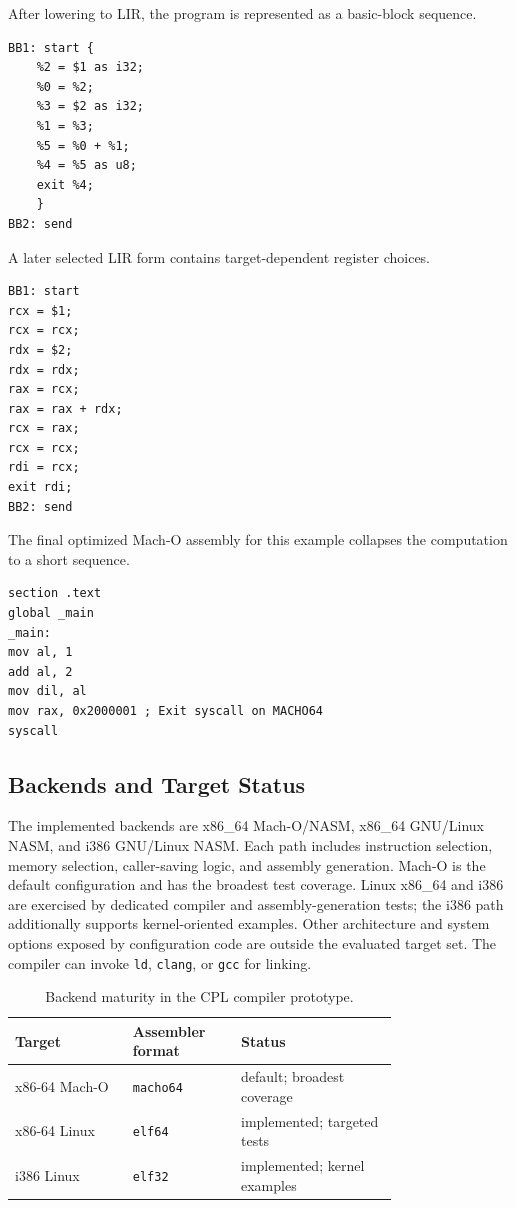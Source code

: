 \documentclass[10pt,twocolumn]{article}
\begin{document}
\par After lowering to LIR, the program is represented as a basic-block sequence.

\begin{lstlisting}[caption={LIR form before target-sensitive selection.}]
BB1: start {
    %2 = $1 as i32;
    %0 = %2;
    %3 = $2 as i32;
    %1 = %3;
    %5 = %0 + %1;
    %4 = %5 as u8;
    exit %4;
    }
BB2: send
\end{lstlisting}

\par A later selected LIR form contains target-dependent register choices.

\begin{lstlisting}[caption={Selected LIR form.}]
BB1: start
rcx = $1;
rcx = rcx;
rdx = $2;
rdx = rdx;
rax = rcx;
rax = rax + rdx;
rcx = rax;
rcx = rcx;
rdi = rcx;
exit rdi;
BB2: send
\end{lstlisting}

\par The final optimized Mach-O assembly for this example collapses the computation to a short sequence.

\begin{lstlisting}[caption={Generated assembly.}]
section .text
global _main
_main:
mov al, 1
add al, 2
mov dil, al
mov rax, 0x2000001 ; Exit syscall on MACHO64
syscall
\end{lstlisting}

\subsection{Backends and Target Status}

\par The implemented backends are x86\_64 Mach-O/NASM, x86\_64 GNU/Linux NASM, and i386 GNU/Linux NASM. Each path includes instruction selection, memory selection, caller-saving logic, and assembly generation. Mach-O is the default configuration and has the broadest test coverage. Linux x86\_64 and i386 are exercised by dedicated compiler and assembly-generation tests; the i386 path additionally supports kernel-oriented examples. Other architecture and system options exposed by configuration code are outside the evaluated target set. The compiler can invoke \texttt{ld}, \texttt{clang}, or \texttt{gcc} for linking.

\begin{table}[t]
\centering
\footnotesize
\caption{Backend maturity in the CPL compiler prototype.}
\label{tab:backend-maturity}
\begin{tabular}{p{0.24\linewidth}p{0.20\linewidth}p{0.32\linewidth}}
\toprule
Target        & Assembler format & Status                       \\
\midrule
x86-64 Mach-O & \texttt{macho64} & default; broadest coverage   \\
x86-64 Linux  & \texttt{elf64}   & implemented; targeted tests  \\
i386 Linux    & \texttt{elf32}   & implemented; kernel examples \\
\bottomrule
\end{tabular}
\end{table}
\end{document}
